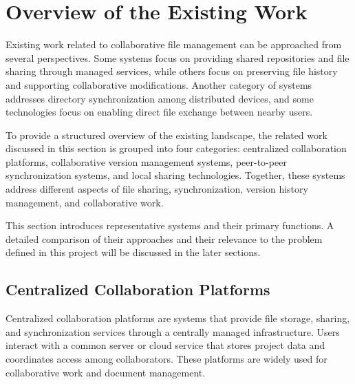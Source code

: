 \section{Overview of the Existing Work}
Existing work related to collaborative file management can be approached from several perspectives.
Some systems focus on providing shared repositories and file sharing through managed services, while others focus on preserving file history and supporting collaborative modifications.
Another category of systems addresses directory synchronization among distributed devices, and some technologies focus on enabling direct file exchange between nearby users.

To provide a structured overview of the existing landscape, the related work discussed in this section is grouped into four categories: centralized collaboration platforms, collaborative version management systems, peer-to-peer synchronization systems, and local sharing technologies. Together, these systems address different aspects of file sharing, synchronization, version history management, and collaborative work.

This section introduces representative systems and their primary functions.
A detailed comparison of their approaches and their relevance to the problem defined in this project will be discussed in the later sections.



\subsection{Centralized Collaboration Platforms}

%

Centralized collaboration platforms are systems that provide file storage, sharing, and synchronization services through a centrally managed infrastructure.
Users interact with a common server or cloud service that stores project data and coordinates access among collaborators.
These platforms are widely used for collaborative work and document management.

